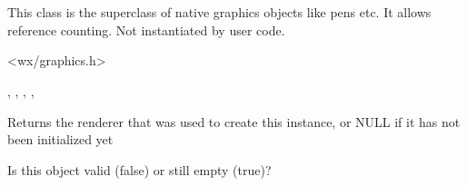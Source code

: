 
\section{}\label{wxgraphicsobject}

This class is the superclass of native graphics objects like pens etc. It allows reference counting. Not instantiated by user code.




<wx/graphics.h>


, , , , 


\label{wxgraphicsobjectgetrenderer}


Returns the renderer that was used to create this instance, or NULL if it has not been initialized yet

\label{wxgraphicsobjectisnull}


Is this object valid (false) or still empty (true)?

